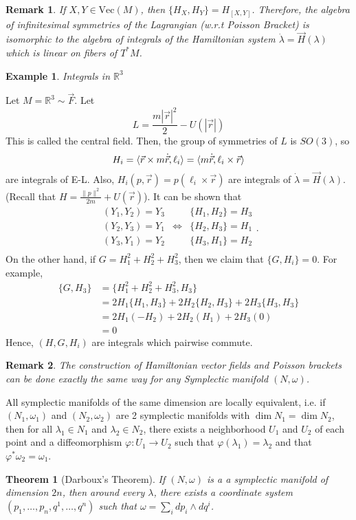 \documentclass{article}
\newcommand{\R}{\mathbb R}
\newcommand{\vhi}{\varphi}
\newcommand{\w}{\omega}
\DeclarePairedDelimiter{\ang}{\langle}{\rangle}
\newtheorem{thm}{Theorem}
\newtheorem{ex}{Example}
\newtheorem{rk}{Remark}
\begin{document}
\begin{rk}
    If $X,Y\in \text{Vec}(M)$, then $\{H_X,H_Y\} = H_{[X,Y]}$. Therefore, the algebra of infinitesimal symmetries of the Lagrangian (w.r.t Poisson Bracket) is isomorphic to the algebra of integrals of the Hamiltonian system $\dot \lambda = \vec H(\lambda)$ which is linear on fibers of $T^*M$.
\end{rk}
\begin{ex}
    Integrals in $\R^3$
\end{ex}
Let $M=\R^3\sim \vec F$. Let
\[L = \frac{m|\vec r|^2}{2} - U(|\vec r|)\]
This is called the central field. Then, the group of symmetries of $L$ is $SO(3)$, so 
\[H_i = \ang{\vec r\times m\dot{\vec r},\ell_i} = \ang{m\dot{\vec r},\ell_i\times\vec r}\]
are integrals of E-L. Also, $H_i(p,\vec r) = p(\ell_i\times \vec {r})$ are integrals of $\dot\lambda = \vec H(\lambda)$. (Recall that $H = \frac{\|p\|^2}{2m} + U(\vec r)$). It can be shown that
\[\begin{array}{ccc}
     (Y_1,Y_2) = Y_3 & & \{H_1,H_2\} = H_3\\
     (Y_2,Y_3) = Y_1 &\Leftrightarrow & \{H_2,H_3\} = H_1\\
     (Y_3,Y_1) = Y_2 & & \{H_3,H_1\} = H_2\\
\end{array}.\]
On the other hand, if $G = H_1^2 + H_2^2 + H_3^2$, then we claim that $\{G,H_i\} = 0$. For example,
\begin{align*}
    \{G,H_3\} &= \{H_1^2 + H_2^2 + H_3^2, H_3\}\\
    &=2H_1\{H_1,H_3\} + 2H_2\{H_2,H_3\} + 2H_3\{H_3,H_3\}\\
    &=2H_1(-H_2) + 2H_2(H_1) + 2H_3(0)\\
    &=0
\end{align*}
Hence, $(H,G,H_i)$ are integrals which pairwise commute.
\begin{rk}
    The construction of Hamiltonian vector fields and Poisson brackets can be done exactly the same way for any Symplectic manifold $(N,\w)$.
\end{rk}
All symplectic manifolds of the same dimension are locally equivalent, i.e. if $(N_1,\w_1)$ and $(N_2,\w_2)$ are 2 symplectic manifolds with $\dim N_1 = \dim N_2$, then for all $\lambda_1\in N_1$ and $\lambda_2\in N_2$, there exists a neighborhood $U_1$ and $U_2$ of each point and a diffeomorphism $\vhi:U_1\to U_2$ such that $\vhi(\lambda_1) = \lambda_2$ and that $\vhi^*\w_2 = \w_1$.
\begin{thm}[Darboux's Theorem]
    If $(N,\w)$ is a a symplectic manifold of dimension $2n$, then around every $\lambda$, there exists a coordinate system $(p_1,\dots, p_n,q^1,\dots, q^n)$ such that $\w = \sum_i dp_i\wedge dq^i$.
\end{thm}
\end{document}
